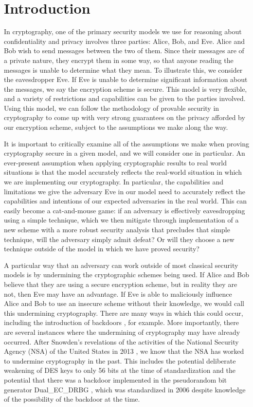 \chapter{Introduction}

In cryptography, one of the primary security models we use for reasoning about confidentiality and privacy involves three parties: Alice, Bob, and Eve. Alice and Bob wish to send messages between the two of them. Since their messages are of a private nature, they encrypt them in some way, so that anyone reading the messages is unable to determine what they mean. To illustrate this, we consider the eavesdropper Eve. If Eve is unable to determine significant information about the messages, we say the encryption scheme is secure. This model is very flexible, and a variety of restrictions and capabilities can be given to the parties involved. Using this model, we can follow the methodology of provable security in cryptography to come up with very strong guarantees on the privacy afforded by our encryption scheme, subject to the assumptions we make along the way.

It is important to critically examine all of the assumptions we make when proving cryptography secure in a given model, and we will consider one in particular. An ever-present assumption when applying cryptographic results to real world situations is that the model accurately reflects the real-world situation in which we are implementing our cryptography. In particular, the capabilities and limitations we give the adversary Eve in our model need to accurately reflect the capabilities and intentions of our expected adversaries in the real world. This can easily become a cat-and-mouse game: if an adversary is effectively eavesdropping using a simple technique, which we then mitigate through implementation of a new scheme with a more robust security analysis that precludes that simple technique, will the adversary simply admit defeat? Or will they choose a new technique outside of the model in which we have proved security?

A particular way that an adversary can work outside of most classical security models is by undermining the cryptographic schemes being used. If Alice and Bob believe that they are using a secure encryption scheme, but in reality they are not, then Eve may have an advantage. If Eve is able to maliciously influence Alice and Bob to use an insecure scheme without their knowledge, we would call this undermining cryptography. There are many ways in which this could occur, including the introduction of backdoors \cite{FSE:RijPre97,FSE:Paterson99}, for example. More importantly, there are several instances where the undermining of cryptography may have already occurred. After Snowden's revelations of the activities of the National Security Agency (NSA) of the United States in 2013 \cite{snowden}, we know that the NSA has worked to undermine cryptography in the past. This includes the potential deliberate weakening of DES keys to only 56 bits at the time of standardization \cite{SB1988} and the potential that there was a backdoor implemented in the pseudorandom bit generator Dual\_EC\_DRBG \cite{USENIX:CNEGLRBMSF14}, which was standardized in 2006 despite knowledge of the possibility of the backdoor at the time.

